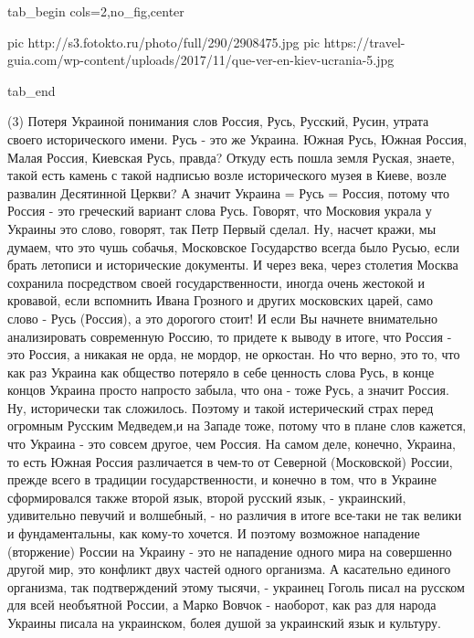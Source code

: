 \ifcmt
  tab_begin cols=2,no_fig,center

     pic http://s3.fotokto.ru/photo/full/290/2908475.jpg
		 pic https://travel-guia.com/wp-content/uploads/2017/11/que-ver-en-kiev-ucrania-5.jpg

  tab_end
\fi

(3) Потеря Украиной понимания слов Россия, Русь, Русский, Русин, утрата своего
исторического имени. Русь - это же Украина. Южная Русь, Южная Россия, Малая
Россия, Киевская Русь, правда?  Откуду есть пошла земля Руская, знаете, такой
есть камень с такой надписью возле исторического музея в Киеве, возле развалин
Десятинной Церкви?  А значит Украина = Русь = Россия, потому что Россия - это
греческий вариант слова Русь. Говорят, что Московия украла у Украины это слово,
говорят, так Петр Первый сделал. Ну, насчет кражи, мы думаем, что это чушь
собачья, Московское Государство всегда было Русью, если брать летописи и
исторические документы. И через века, через столетия Москва сохранила
посредством своей государственности, иногда очень жестокой и кровавой, если
вспомнить Ивана Грозного и других московских царей, само слово - Русь (Россия),
а это дорогого стоит! И если Вы начнете внимательно анализировать современную
Россию, то придете к выводу в итоге, что Россия - это Россия, а никакая не
орда, не мордор, не оркостан. Но что верно, это то, что как раз Украина как
общество потеряло в себе ценность слова Русь, в конце концов Украина просто
напросто забыла, что она - тоже Русь, а значит Россия. Ну, исторически так
сложилось. Поэтому и такой истерический страх перед огромным Русским Медведем,и
на Западе тоже, потому что в плане слов кажется, что Украина - это совсем
другое, чем Россия. На самом деле, конечно, Украина, то есть Южная Россия
различается в чем-то от Северной (Московской) России, прежде всего в традиции
государственности, и конечно в том, что в Украине сформировался также второй
язык, второй русский язык, - украинский, удивительно певучий и волшебный, - но
различия в итоге все-таки не так велики и фундаментальны, как кому-то хочется.
И поэтому возможное нападение (вторжение) России на Украину - это не нападение
одного мира на совершенно другой мир, это конфликт двух частей одного
организма. А касательно единого организма, так подтверждений этому тысячи, -
украинец Гоголь писал на русском для всей необъятной России, а Марко Вовчок -
наоборот, как раз для народа Украины писала на украинском, болея душой за
украинский язык и культуру.

